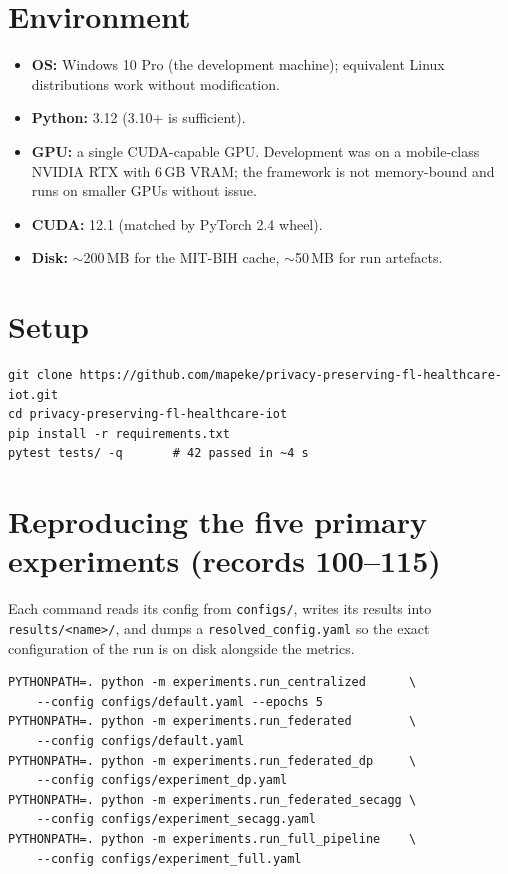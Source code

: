 \documentclass[11pt,a4paper]{report}
\begin{document}
\section{Environment}

\begin{itemize}[leftmargin=*]
  \item \textbf{OS:} Windows 10 Pro (the development machine); equivalent
  Linux distributions work without modification.
  \item \textbf{Python:} 3.12 (3.10+ is sufficient).
  \item \textbf{GPU:} a single CUDA-capable GPU. Development was on a
  mobile-class NVIDIA RTX with 6\,GB VRAM; the framework is not
  memory-bound and runs on smaller GPUs without issue.
  \item \textbf{CUDA:} 12.1 (matched by PyTorch 2.4 wheel).
  \item \textbf{Disk:} $\sim$200\,MB for the MIT-BIH cache, $\sim$50\,MB
  for run artefacts.
\end{itemize}

\section{Setup}

\begin{verbatim}
git clone https://github.com/mapeke/privacy-preserving-fl-healthcare-iot.git
cd privacy-preserving-fl-healthcare-iot
pip install -r requirements.txt
pytest tests/ -q       # 42 passed in ~4 s
\end{verbatim}

\section{Reproducing the five primary experiments (records 100--115)}

Each command reads its config from \texttt{configs/}, writes its
results into \texttt{results/<name>/}, and dumps a
\texttt{resolved\_config.yaml} so the exact configuration of the run is
on disk alongside the metrics.

\begin{verbatim}
PYTHONPATH=. python -m experiments.run_centralized      \
    --config configs/default.yaml --epochs 5
PYTHONPATH=. python -m experiments.run_federated        \
    --config configs/default.yaml
PYTHONPATH=. python -m experiments.run_federated_dp     \
    --config configs/experiment_dp.yaml
PYTHONPATH=. python -m experiments.run_federated_secagg \
    --config configs/experiment_secagg.yaml
PYTHONPATH=. python -m experiments.run_full_pipeline    \
    --config configs/experiment_full.yaml
\end{verbatim}
\end{document}
